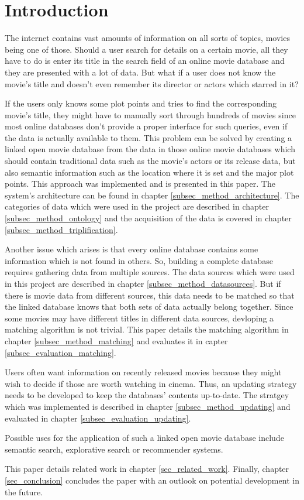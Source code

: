 \section{Introduction}
\label{sec_introduction}

The internet contains vast amounts of information on all sorts of topics, movies being one of those.
Should a user search for details on a certain movie, all they have to do is enter its title in the search field of an online movie database and they are presented with a lot of data.
But what if a user does not know the movie's title and doesn't even remember its director or actors which starred in it?

If the users only knows some plot points and tries to find the corresponding movie's title, they might have to manually sort through hundreds of movies since most online databases don't provide a proper interface for such queries, even if the data is actually available to them.
This problem can be solved by creating a linked open movie database from the data in those online movie databases which should contain traditional data such as the movie's actors or its release data, but also semantic information such as the location where it is set and the major plot points.
This approach was implemented and is presented in this paper.
The system's architecture can be found in chapter \ref{subsec_method_architecture}.
The categories of data which were used in the project are described in chapter \ref{subsec_method_ontology} and the acquisition of the data is covered in chapter \ref{subsec_method_triplification}.

Another issue which arises is that every online database contains some information which is not found in others.
So, building a complete database requires gathering data from multiple sources.
The data sources which were used in this project are described in chapter \ref{subsec_method_datasources}.
But if there is movie data from different sources, this data needs to be matched so that the linked database knows that both sets of data actually belong together.
Since some movies may have different titles in different data sources, devloping a matching algorithm is not trivial.
This paper details the matching algorithm in chapter \ref{subsec_method_matching} and evaluates it in capter \ref{subsec_evaluation_matching}.

Users often want information on recently released movies because they might wish to decide if those are worth watching in cinema.
Thus, an updating strategy needs to be developed to keep the databases' contents up-to-date.
The stratgey which was implemented is described in chapter \ref{subsec_method_updating} and evaluated in chapter \ref{subsec_evaluation_updating}.

Possible uses for the application of such a linked open movie database include semantic search, explorative search or recommender systems.

This paper details related work in chapter \ref{sec_related_work}. 
Finally, chapter \ref{sec_conclusion} concludes the paper with an outlook on potential development in the future.